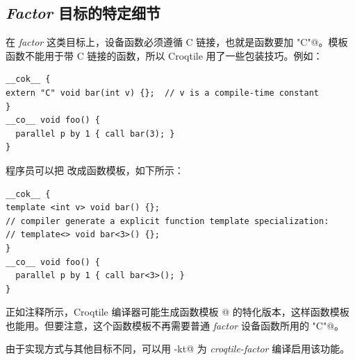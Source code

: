 \subsection*{\emph{Factor} 目标的特定细节}

在 \emph{factor} 这类目标上，设备函数必须遵循 C 链接，也就是函数要加 \co@extern "C"@。模板函数不能用于带 C 链接的函数，所以 Croqtile 用了一些包装技巧。例如：

\begin{lstlisting}[language=croqtile,caption={包住设备代码的 cok 块}]
__cok__ {
extern "C" void bar(int v) {};  // v is a compile-time constant
}
__co__ void foo() {
  parallel p by 1 { call bar(3); }
}
\end{lstlisting}

程序员可以把 \co@bar@ 改成函数模板，如下所示：

\begin{lstlisting}[language=croqtile,caption={抽取目标特定细节之后的块}]
__cok__ {
template <int v> void bar() {};
// compiler generate a explicit function template specialization:
// template<> void bar<3>() {};
}
__co__ void foo() {
  parallel p by 1 { call bar<3>(); }
}
\end{lstlisting}

正如注释所示，Croqtile 编译器可能生成函数模板 @ 的特化版本，这样函数模板也能用。但要注意，这个函数模板不再需要普通 \emph{factor} 设备函数所用的 \co@extern "C"@。

由于实现方式与其他目标不同，可以用 \co@-kt@ 为 \emph{croqtile-factor} 编译启用该功能。
